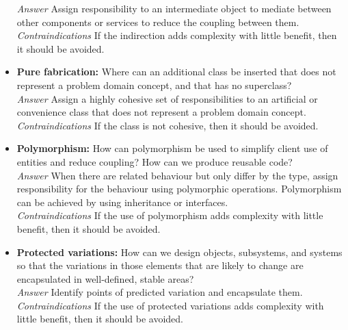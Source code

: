 \begin{itemize}
    \textit{Answer} Assign responsibility to an intermediate object to mediate between other components or services to reduce the coupling between them.\\
    \textit{Contraindications} If the indirection adds complexity with little benefit, then it should be avoided.
    \item \textbf{Pure fabrication:} Where can an additional class be inserted that does not represent a problem domain concept, and that has no superclass?\\
    \textit{Answer} Assign a highly cohesive set of responsibilities to an artificial or convenience class that does not represent a problem domain concept.\\
    \textit{Contraindications} If the class is not cohesive, then it should be avoided.
    \item \textbf{Polymorphism:} How can polymorphism be used to simplify client use of entities and reduce coupling? How can we produce reusable code?\\
    \textit{Answer} When there are related behaviour but only differ by the type, assign responsibility for the behaviour using polymorphic operations. Polymorphism can be achieved by using inheritance or interfaces.\\
    \textit{Contraindications} If the use of polymorphism adds complexity with little benefit, then it should be avoided.
    \item \textbf{Protected variations:} How can we design objects, subsystems, and systems so that the variations in those elements that are likely to change are encapsulated in well-defined, stable areas?\\
    \textit{Answer} Identify points of predicted variation and encapsulate them.\\
    \textit{Contraindications} If the use of protected variations adds complexity with little benefit, then it should be avoided.
\end{itemize}
